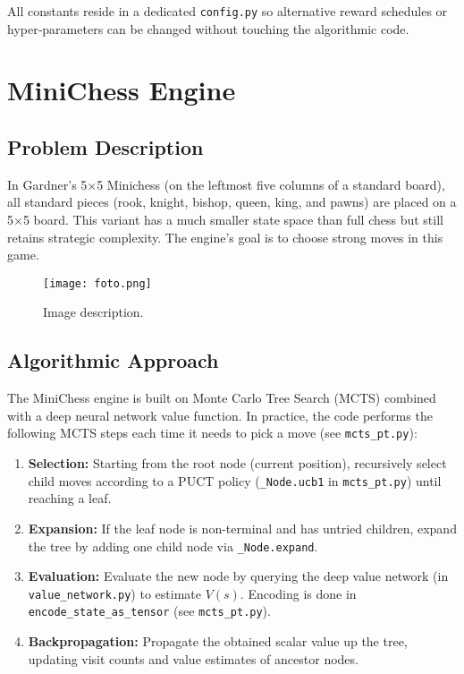 \documentclass{report}
\begin{document}
All constants reside in a dedicated \texttt{config.py} so alternative reward schedules or hyper‑parameters can be changed without touching the algorithmic code.

\chapter{MiniChess Engine}

\section{Problem Description}
In Gardner’s 5×5 Minichess (on the leftmost five columns of a standard board), all standard pieces (rook, knight, bishop, queen, king, and pawns) are placed on a 5×5 board. This variant has a much smaller state space than full chess but still retains strategic complexity. The engine’s goal is to choose strong moves in this game.

\begin{figure}[h!]
    \centering
    \texttt{[image: foto.png]}
    \caption{Image description.}
    \label{fig:foto}
\end{figure}

\section{Algorithmic Approach}
The MiniChess engine is built on Monte Carlo Tree Search (MCTS) combined with a deep neural network value function. In practice, the code performs the following MCTS steps each time it needs to pick a move (see \texttt{mcts\_pt.py}):

\begin{enumerate}
  \item \textbf{Selection:} Starting from the root node (current position), recursively select child moves according to a PUCT policy (\texttt{\_Node.ucb1} in \texttt{mcts\_pt.py}) until reaching a leaf.
  \item \textbf{Expansion:} If the leaf node is non-terminal and has untried children, expand the tree by adding one child node via \texttt{\_Node.expand}.
  \item \textbf{Evaluation:} Evaluate the new node by querying the deep value network (in \texttt{value\_network.py}) to estimate $V(s)$. Encoding is done in \texttt{encode\_state\_as\_tensor} (see \texttt{mcts\_pt.py}).
  \item \textbf{Backpropagation:} Propagate the obtained scalar value up the tree, updating visit counts and value estimates of ancestor nodes.
\end{enumerate}
\end{document}
